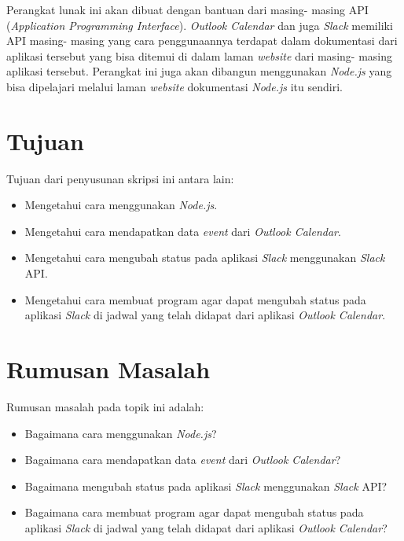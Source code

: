 \documentclass[a4paper,twoside]{article}
\begin{document}
Perangkat lunak ini akan dibuat dengan bantuan dari masing- masing API (\textit{Application Programming Interface}). \textit{Outlook Calendar} dan juga \textit{Slack} memiliki API masing- masing yang cara penggunaannya terdapat dalam dokumentasi dari aplikasi tersebut yang bisa ditemui di dalam laman \textit{website} dari masing- masing aplikasi tersebut. Perangkat ini juga akan dibangun menggunakan \textit{Node.js} yang bisa dipelajari melalui laman \textit{website} dokumentasi \textit{Node.js} itu sendiri. 

\section{Tujuan}
Tujuan dari penyusunan skripsi ini antara lain:
\begin{itemize}
	\item Mengetahui cara menggunakan \textit{Node.js}. 
	\item Mengetahui cara mendapatkan data \textit{event} dari \textit{Outlook Calendar}.   
	\item Mengetahui cara mengubah status pada aplikasi \textit{Slack} menggunakan \textit{Slack} API. 
	\item Mengetahui cara membuat program agar dapat mengubah status pada aplikasi \textit{Slack} di jadwal yang telah didapat dari aplikasi \textit{Outlook Calendar}.  
	
\end{itemize}

\section{Rumusan Masalah}
Rumusan masalah pada topik ini adalah:
\begin{itemize}
	\item Bagaimana cara menggunakan \textit{Node.js}?
	\item Bagaimana cara mendapatkan data \textit{event} dari \textit{Outlook Calendar}?
	\item Bagaimana mengubah status pada aplikasi \textit{Slack} menggunakan \textit{Slack} API?  
	\item Bagaimana cara membuat program agar dapat mengubah status pada aplikasi \textit{Slack} di jadwal yang telah didapat dari aplikasi \textit{Outlook Calendar}? 
	
\end{itemize}
\end{document}
